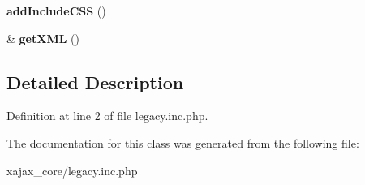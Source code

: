 \begin{DoxyCompactItemize}
\item 
\hypertarget{classlegacyXajaxResponse_ae635d26d99fdd5fc3c5d684a3ecad9e2}{
{\bfseries addIncludeCSS} ()}
\label{classlegacyXajaxResponse_ae635d26d99fdd5fc3c5d684a3ecad9e2}

\item 
\hypertarget{classlegacyXajaxResponse_a798a52666d30f911ecca64985c182d76}{
\& {\bfseries getXML} ()}
\label{classlegacyXajaxResponse_a798a52666d30f911ecca64985c182d76}

\end{DoxyCompactItemize}


\subsection{Detailed Description}


Definition at line 2 of file legacy.inc.php.



The documentation for this class was generated from the following file:\begin{DoxyCompactItemize}
\item 
xajax\_\-core/legacy.inc.php\end{DoxyCompactItemize}
